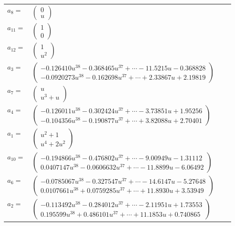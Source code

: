 \documentclass[1p]{elsarticle_modified}
\theoremstyle{definition}
\begin{document}
\begin{tabular}{m{7pt} m{180pt} m{7pt} m{180pt} }
\flushright $a_{8}=$&$\begin{pmatrix}0\\u\end{pmatrix}$ \\
\flushright $a_{11}=$&$\begin{pmatrix}1\\0\end{pmatrix}$ \\
\flushright $a_{12}=$&$\begin{pmatrix}1\\u^2\end{pmatrix}$ \\
\flushright $a_{3}=$&$\begin{pmatrix}-0.126410 u^{38}-0.368465 u^{37}+\cdots-11.5215 u-0.368828\\-0.0920273 u^{38}-0.162698 u^{37}+\cdots+2.33867 u+2.19819\end{pmatrix}$ \\
\flushright $a_{7}=$&$\begin{pmatrix}u\\u^3+u\end{pmatrix}$ \\
\flushright $a_{4}=$&$\begin{pmatrix}-0.126011 u^{38}-0.302424 u^{37}+\cdots-3.73851 u+1.95256\\-0.104356 u^{38}-0.190877 u^{37}+\cdots+3.82088 u+2.70401\end{pmatrix}$ \\
\flushright $a_{1}=$&$\begin{pmatrix}u^2+1\\u^4+2 u^2\end{pmatrix}$ \\
\flushright $a_{10}=$&$\begin{pmatrix}-0.194866 u^{38}-0.476802 u^{37}+\cdots-9.00949 u-1.31112\\0.0407147 u^{38}-0.0606632 u^{37}+\cdots-11.8899 u-6.06492\end{pmatrix}$ \\
\flushright $a_{6}=$&$\begin{pmatrix}-0.0785067 u^{38}-0.327547 u^{37}+\cdots-14.6147 u-5.27648\\0.0107661 u^{38}+0.0759285 u^{37}+\cdots+11.8930 u+3.53949\end{pmatrix}$ \\
\flushright $a_{2}=$&$\begin{pmatrix}-0.113492 u^{38}-0.284012 u^{37}+\cdots-2.11951 u+1.73553\\0.195599 u^{38}+0.486101 u^{37}+\cdots+11.1853 u+0.740865\end{pmatrix}$ \\

\end{tabular}
\end{document}

